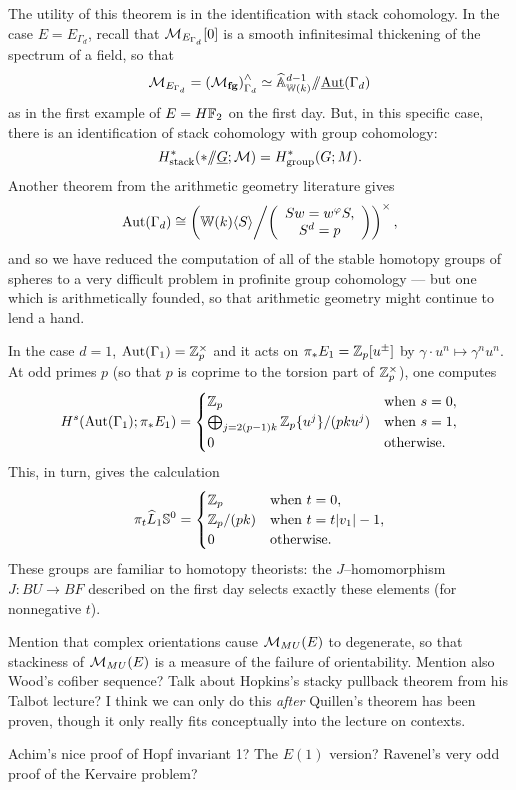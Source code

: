 The utility of this theorem is in the identification with stack cohomology.  In the case $E = E_{\Gamma_d}$, recall that $\context{E_{\Gamma_d}}[0]$ is a smooth infinitesimal thickening of the spectrum of a field, so that \[\context{E_{\Gamma_d}} = \left( \moduli{fg} \right)^\wedge_{\Gamma_d} \simeq \widehat{\mathbb A}^{d-1}_{\mathbb W(k)} \mmod \underline{\operatorname{Aut}}(\Gamma_d)\] as in the first example of $E = H\F_2$ on the first day.  But, in this specific case, there is an identification of stack cohomology with group cohomology: \[H^*_{\mathrm{stack}}(* \mmod \underline{G}; \mathcal M) = H^*_{\mathrm{group}}(G; M).\]  Another theorem from the arithmetic geometry literature gives \[\operatorname{Aut}(\Gamma_d) \cong \left( \mathbb{W}(k)\langle S \rangle \middle/ \left( \begin{array}{c} Sw = w^\phi S, \\ S^d = p \end{array} \right) \right)^\times,\] and so we have reduced the computation of all of the stable homotopy groups of spheres to a very difficult problem in profinite group cohomology --- but one which is arithmetically founded, so that arithmetic geometry might continue to lend a hand. 

\begin{example}[Adams]
In the case $d = 1$, $\operatorname{Aut}(\Gamma_1) = \Z_p^\times$ and it acts on $\pi_* E_1 = \Z_p[u^\pm]$ by $\gamma \cdot u^n \mapsto \gamma^n u^n$.  At odd primes $p$ (so that $p$ is coprime to the torsion part of $\Z_p^\times$), one computes \[H^s(\operatorname{Aut}(\Gamma_1); \pi_* E_1) = \begin{cases}\Z_p & \text{when $s = 0$}, \\ \bigoplus_{j = 2(p-1)k} \Z_p\{u^j\} / (pk u^j) & \text{when $s = 1$}, \\ 0 & \text{otherwise}. \end{cases}\]  This, in turn, gives the calculation \[\pi_t \widehat L_1 \S^0 = \begin{cases} \Z_p & \text{when $t = 0$}, \\ \Z_p / (pk) & \text{when $t = t|v_1| - 1$}, \\ 0 & \text{otherwise}. \end{cases}\]  These groups are familiar to homotopy theorists: the $J$--homomorphism $J: BU \to BF$ described on the first day selects exactly these elements (for nonnegative $t$).
\end{example}






Mention that complex orientations cause $\context{MU}(E)$ to degenerate, so that stackiness of $\context{MU}(E)$ is a measure of the failure of orientability.  Mention also Wood's cofiber sequence?  Talk about Hopkins's stacky pullback theorem from his Talbot lecture?  I think we can only do this \emph{after} Quillen's theorem has been proven, though it only really fits conceptually into the lecture on contexts.

Achim's nice proof of Hopf invariant 1?  The $E(1)$ version?  Ravenel's very odd proof of the Kervaire problem?
